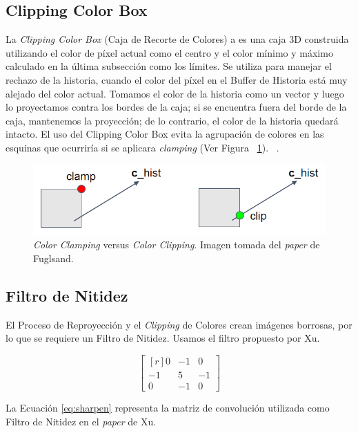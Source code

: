 \documentclass[pregrado]{tesis-usb} %
\begin{document}
\subsection{Clipping Color Box} 
La \textit{Clipping Color Box} (Caja de Recorte de Colores) a es una caja 3D construida utilizando el color de píxel actual como el centro y el color mínimo y máximo calculado en la última subsección como los límites. Se utiliza para manejar el rechazo de la historia, cuando el color del píxel en el Buffer de Historia está muy alejado del color actual. Tomamos el color de la historia como un vector y luego lo proyectamos contra los bordes de la caja; si se encuentra fuera del borde de la caja, mantenemos la proyección; de lo contrario, el color de la historia quedará intacto. El uso del Clipping Color Box evita la agrupación de colores en las esquinas que ocurriría si se aplicara \textit{clamping} (Ver Figura ~\ref{fig:clippingbox}). ~\cite{Fuglsand2016}.

\begin{figure}[!hbt]
	\centering
	\includegraphics[scale=0.4]{images/clipping_box.png}
	\caption{\textit{Color Clamping} versus \textit{Color Clipping}. Imagen tomada del \textit{paper} de Fuglsand. \protect\cite{Fuglsand2016}}\label{fig:clippingbox}
\end{figure}


\subsection{Filtro de Nitidez} 
El Proceso de Reproyección y el \textit{Clipping} de Colores crean imágenes borrosas, por lo que se requiere un Filtro de Nitidez. Usamos el filtro propuesto por Xu. ~\cite{XU2016}

\begin{equation} \label{eq:sharpen}
\begin{bmatrix*}[r]
0 & -1 &  0 \\
-1 &  5 & -1 \\
0 & -1 &  0
\end{bmatrix*}
\end{equation}

La Ecuación \ref{eq:sharpen} representa la matriz de convolución utilizada como Filtro de Nitidez en el \textit{paper} de Xu. \protect\cite{XU2016}
\end{document}
